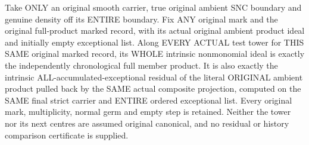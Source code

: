\begin{theorem}
\label{hir:sharp-actual-original-controlled-history-all-exceptional-residual}
\leanok
Take ONLY an original smooth carrier, true original ambient SNC boundary
and genuine density off its ENTIRE boundary. Fix ANY original mark and
the original full-product marked record, with its actual original ambient
product ideal and initially empty exceptional list. Along EVERY ACTUAL
test tower for THIS SAME original marked record, its WHOLE intrinsic
nonmonomial ideal is exactly the independently chronological full member
product. It is also exactly the intrinsic ALL-accumulated-exceptional
residual of the literal ORIGINAL ambient product pulled back by the
SAME actual composite projection, computed on the SAME final strict
carrier and ENTIRE ordered exceptional list. Every original mark,
multiplicity, normal germ and empty step is retained. Neither the tower
nor its next centres are assumed original canonical, and no residual or
history comparison certificate is supplied.
\end{theorem}
